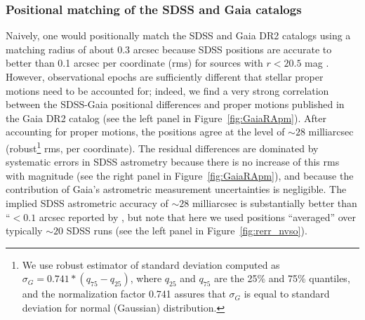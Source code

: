 \subsubsection{Positional matching of the SDSS and Gaia catalogs}
Naively, one would positionally match the SDSS and Gaia DR2 catalogs using a matching radius of 
about 0.3 arcsec because SDSS positions are accurate to better than 0.1 arcsec per coordinate (rms) 
for sources with $r < 20.5$ mag \citep{2003AJ....125.1559P}.  However, observational epochs are
sufficiently different that stellar proper motions need to be accounted for; indeed, we find a very 
strong correlation between the SDSS-Gaia positional differences and proper motions published in 
the Gaia DR2 catalog (see the left panel in  Figure~\ref{fig:GaiaRApm}). After accounting for proper
motions,  the positions agree at the level of $\sim28$ milliarcsec (robust\footnote{We use robust estimator 
of standard deviation computed as $\sigma_G = 0.741*(q_{75}-q_{25})$, where $q_{25}$ and $q_{75}$ are 
the 25\% and 75\% quantiles, and the normalization factor 0.741 assures that $\sigma_G$ is equal to 
standard deviation for normal (Gaussian) distribution.}
rms, per coordinate). The 
residual differences are dominated by systematic errors in SDSS astrometry because there is
no increase of this rms with magnitude (see the right panel in Figure~\ref{fig:GaiaRApm}), and
because the contribution of Gaia's astrometric measurement uncertainties is negligible. 
The implied SDSS astrometric accuracy of $\sim28$ milliarcsec is substantially better than 
``$<0.1$ arcsec reported by \cite{2003AJ....125.1559P}, but note that here we used 
positions ``averaged'' over typically $\sim20$ SDSS runs (see the left panel in Figure~\ref{fig:rerr_nvso}). 

